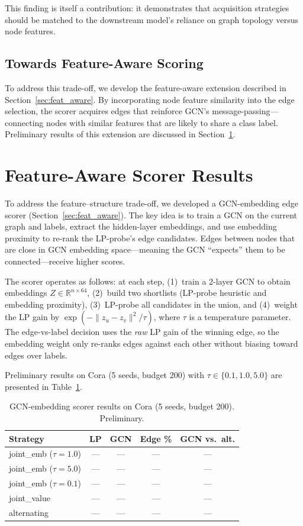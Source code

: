 \documentclass[12pt,a4paper,oneside]{report}
\begin{document}
This finding is itself a contribution: it demonstrates that acquisition strategies should be matched to the downstream model's reliance on graph topology versus node features.

\subsection{Towards Feature-Aware Scoring}

To address this trade-off, we develop the feature-aware extension described in Section~\ref{sec:feat_aware}. By incorporating node feature similarity into the edge selection, the scorer acquires edges that reinforce GCN's message-passing---connecting nodes with similar features that are likely to share a class label. Preliminary results of this extension are discussed in Section~\ref{sec:feat_results}.

\section{Feature-Aware Scorer Results}
\label{sec:feat_results}

To address the feature--structure trade-off, we developed a GCN-embedding edge scorer (Section~\ref{sec:feat_aware}). The key idea is to train a GCN on the current graph and labels, extract the hidden-layer embeddings, and use embedding proximity to re-rank the LP-probe's edge candidates. Edges between nodes that are close in GCN embedding space---meaning the GCN ``expects'' them to be connected---receive higher scores.

The scorer operates as follows: at each step, (1)~train a 2-layer GCN to obtain embeddings $Z \in \mathbb{R}^{n \times 64}$, (2)~build two shortlists (LP-probe heuristic and embedding proximity), (3)~LP-probe all candidates in the union, and (4)~weight the LP gain by $\exp(-\|z_u - z_v\|^2 / \tau)$, where $\tau$ is a temperature parameter. The edge-vs-label decision uses the \emph{raw} LP gain of the winning edge, so the embedding weight only re-ranks edges against each other without biasing toward edges over labels.

Preliminary results on Cora (5 seeds, budget 200) with $\tau \in \{0.1, 1.0, 5.0\}$ are presented in Table~\ref{tab:emb_results}.

\begin{table}[htbp]
\centering
\caption{GCN-embedding scorer results on Cora (5 seeds, budget 200). Preliminary.}
\label{tab:emb_results}
\small
\begin{tabular}{lcccc}
\toprule
Strategy & LP & GCN & Edge \% & GCN vs.\ alt. \\
\midrule
joint\_emb ($\tau=1.0$)  & --- & --- & --- & --- \\
joint\_emb ($\tau=5.0$)  & --- & --- & --- & --- \\
joint\_emb ($\tau=0.1$)  & --- & --- & --- & --- \\
joint\_value              & --- & --- & --- & --- \\
alternating               & --- & --- & --- & --- \\
\bottomrule
\end{tabular}
\end{table}
\end{document}

